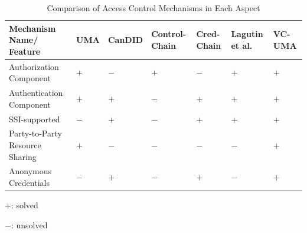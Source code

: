 \documentclass[conference, dvipdfmx]{IEEEtran} %
\begin{document}
\begin{sloppypar}

\begin{table}[H]
  \begin{center}
  \caption{Comparison of Access Control Mechanisms in Each Aspect}
  \label{table:Evaluation_table}

  \begin{threeparttable} %
    \begin{tabular}{p{1.5cm} >{\centering\arraybackslash}p{0.4cm} >{\centering\arraybackslash}p{0.6cm} >{\centering\arraybackslash}p{0.8cm} >{\centering\arraybackslash}p{0.8cm} >{\centering\arraybackslash}p{0.8cm} >{\centering\arraybackslash}p{0.8cm}}
    \hline
    Mechanism Name/ Feature & UMA & CanDID \cite{CanDID} & Control-Chain \cite{Controlchain}
    & Cred-Chain \cite{Selective_Disclosure_paper} & Lagutin et al. \cite{VC_Oauth} 	& VC-UMA \\ \hline\hline
    Authorization Component & $+$ & $-$ & $+$ & $-$ & $+$ & $+$ \\ \hline
    Authentication Component & $+$ & $+$ & $-$ & $+$ & $+$ & $+$ \\ \hline
    SSI-supported  & $-$ & $+$ &  $-$ & $+$ & $+$ & $+$ \\ \hline
    Party-to-Party Resource Sharing & $+$ &  $-$  & $-$ & $-$ & $-$ & $+$ \\ \hline
    Anonymous Credentials & $-$ & $+$  & $-$ & $+$  & $-$  & $+$ \\ \hline
    \end{tabular}
    \begin{tablenotes} %
      \item $+$: solved%
      \item $-$: unsolved%
      \end{tablenotes} %
  \end{threeparttable} %
  \end{center}

\end{table}


\end{sloppypar}
\end{document}
